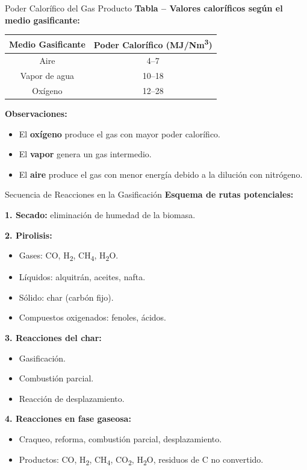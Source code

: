 \documentclass[../../main.tex]{subfiles}
\begin{document}
\begin{frame}{Poder Calorífico del Gas Producto}
\small
\textbf{Tabla – Valores caloríficos según el medio gasificante:}

\vspace{0.5em}
\begin{tabular}{|c|c|}
\hline
\textbf{Medio Gasificante} & \textbf{Poder Calorífico (MJ/Nm\textsuperscript{3})} \\
\hline
Aire & 4–7 \\
Vapor de agua & 10–18 \\
Oxígeno & 12–28 \\
\hline
\end{tabular}

\vspace{1em}
\textbf{Observaciones:}
\begin{itemize}
  \item El \textbf{oxígeno} produce el gas con mayor poder calorífico.
  \item El \textbf{vapor} genera un gas intermedio.
  \item El \textbf{aire} produce el gas con menor energía debido a la dilución con nitrógeno.
\end{itemize}
\end{frame}

\begin{frame}{Secuencia de Reacciones en la Gasificación}
\small
\textbf{Esquema de rutas potenciales:}

\vspace{0.5em}
\textbf{1. Secado:} eliminación de humedad de la biomasa.

\textbf{2. Pirolisis:} 
\begin{itemize}
  \item Gases: CO, H\textsubscript{2}, CH\textsubscript{4}, H\textsubscript{2}O.
  \item Líquidos: alquitrán, aceites, nafta.
  \item Sólido: char (carbón fijo).
  \item Compuestos oxigenados: fenoles, ácidos.
\end{itemize}

\textbf{3. Reacciones del char:}
\begin{itemize}
  \item Gasificación.
  \item Combustión parcial.
  \item Reacción de desplazamiento.
\end{itemize}

\textbf{4. Reacciones en fase gaseosa:}
\begin{itemize}
  \item Craqueo, reforma, combustión parcial, desplazamiento.
  \item Productos: CO, H\textsubscript{2}, CH\textsubscript{4}, CO\textsubscript{2}, H\textsubscript{2}O, residuos de C no convertido.
\end{itemize}
\end{frame}
\end{document}
